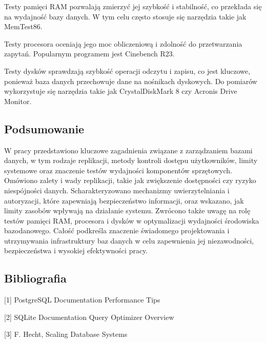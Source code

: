 \documentclass[a4paper,11pt,openany,english]{sphinxmanual}
\begin{document}
\sphinxAtStartPar
Testy pamięci RAM pozwalają zmierzyć jej szybkość i stabilność, co przekłada się na wydajność bazy danych. W tym celu często stosuje się narzędzia takie jak MemTest86.

\sphinxAtStartPar
Testy procesora oceniają jego moc obliczeniową i zdolność do przetwarzania zapytań. Popularnym programem jest Cinebench R23.

\sphinxAtStartPar
Testy dysków sprawdzają szybkość operacji odczytu i zapisu, co jest kluczowe, ponieważ baza danych przechowuje dane na nośnikach dyskowych. Do pomiarów wykorzystuje się narzędzia takie jak CrystalDiskMark 8 czy Acronis Drive Monitor.


\subsection{Podsumowanie}
\label{\detokenize{rozdzial2/Wydajnosc-Skalowanie-i-Replikacja/index:podsumowanie}}
\sphinxAtStartPar
W pracy przedstawiono kluczowe zagadnienia związane z zarządzaniem bazami danych, w tym rodzaje replikacji, metody kontroli dostępu użytkowników, limity systemowe oraz znaczenie testów wydajności komponentów sprzętowych. Omówiono zalety i wady replikacji, takie jak zwiększenie dostępności czy ryzyko niespójności danych. Scharakteryzowano mechanizmy uwierzytelniania i autoryzacji, które zapewniają bezpieczeństwo informacji, oraz wskazano, jak limity zasobów wpływają na działanie systemu. Zwrócono także uwagę na rolę testów pamięci RAM, procesora i dysków w optymalizacji wydajności środowiska bazodanowego. Całość podkreśla znaczenie świadomego projektowania i utrzymywania infrastruktury baz danych w celu zapewnienia jej niezawodności, bezpieczeństwa i wysokiej efektywności pracy.


\subsection{Bibliografia}
\label{\detokenize{rozdzial2/Wydajnosc-Skalowanie-i-Replikacja/index:bibliografia}}
\sphinxAtStartPar
{[}1{]} PostgreSQL Documentation \textendash{} Performance Tips

\sphinxAtStartPar
{[}2{]} SQLite Documentation \textendash{} Query Optimizer Overview

\sphinxAtStartPar
{[}3{]} F. Hecht, Scaling Database Systems
\end{document}
